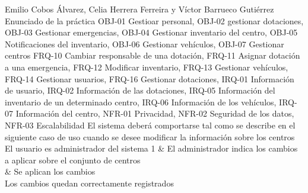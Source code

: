 {Emilio Cobos Álvarez, Celia Herrera Ferreira y Víctor Barrueco Gutiérrez}
{Enunciado de la práctica}
{OBJ-01 Gestioar personal, OBJ-02 gestionar dotaciones, OBJ-03 Gestionar emergencias, OBJ-04 Gestionar inventario del centro, OBJ-05 Notificaciones del inventario, OBJ-06 Gestionar vehículos, OBJ-07 Gestionar centros}
{FRQ-10 Cambiar responsable de una dotación, FRQ-11 Asignar dotación a una emergencia, FRQ-12 Modificar inventario, FRQ-13 Gestionar vehículos, FRQ-14 Gestionar usuarios, FRQ-16 Gestionar dotaciones, IRQ-01 Información de usuario, IRQ-02 Información de las dotaciones, IRQ-05 Información del inventario de un determinado centro, IRQ-06 Información de los vehículos, IRQ-07 Información del centro, NFR-01 Privacidad, NFR-02 Seguridad de los datos, NFR-03 Escalabilidad}
{El sistema deberá comportarse tal como se describe en el siguiente caso de uso cuando se desee modificar la información sobre los centros}
{El usuario es administrador del sistema}
{
1 & El administrador indica los cambios a aplicar sobre el conjunto de centros \\  & Se aplican los cambios \\
}
{Los cambios quedan correctamente registrados}
{}

